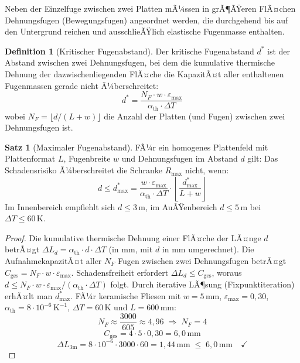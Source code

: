 ﻿\documentclass[a4paper,12pt]{article}
\theoremstyle{definition}
\newtheorem{definition}{Definition}
\newtheorem{satz}{Satz}
\begin{document}
Neben der Einzelfuge zwischen zwei Platten mÃ¼ssen in grÃ¶ÃŸeren FlÃ¤chen
Dehnungsfugen (Bewegungsfugen) angeordnet werden, die durchgehend bis
auf den Untergrund reichen und ausschlieÃŸlich elastische Fugenmasse
enthalten.

\begin{definition}[Kritischer Fugenabstand]
	Der kritische Fugenabstand $d^*$ ist der Abstand zwischen zwei
	Dehnungsfugen, bei dem die kumulative thermische Dehnung der
	dazwischenliegenden FlÃ¤che die KapazitÃ¤t aller enthaltenen
	Fugenmassen gerade nicht Ã¼berschreitet:
	\[
	d^* = \frac{N_F \cdot w \cdot \varepsilon_{\max}}{\alpha_{\text{th}} \cdot \Delta T}
	\]
	wobei $N_F = \lfloor d / (L + w) \rfloor$ die Anzahl der Platten
	(und Fugen) zwischen zwei Dehnungsfugen ist.
\end{definition}

\begin{satz}[Maximaler Fugenabstand]
	\label{satz:fugenabstand}
	FÃ¼r ein homogenes Plattenfeld mit Plattenformat $L$, Fugenbreite $w$
	und Dehnungsfugen im Abstand $d$ gilt: Das Schadensrisiko Ã¼berschreitet
	die Schranke $R_{\max}$ nicht, wenn:
	\[
	d \leq d^*_{\max} = \frac{w \cdot \varepsilon_{\max}}{\alpha_{\text{th}} \cdot \Delta T}
	\cdot \left\lfloor \frac{d^*_{\max}}{L + w} \right\rfloor
	\]
	Im Innenbereich empfiehlt sich $d \leq 3\,\text{m}$, im AuÃŸenbereich
	$d \leq 5\,\text{m}$ bei $\Delta T \leq 60\,\text{K}$.
\end{satz}

\begin{proof}
	Die kumulative thermische Dehnung einer FlÃ¤che der LÃ¤nge $d$ betrÃ¤gt
	$\Delta L_d = \alpha_{\text{th}} \cdot d \cdot \Delta T$ (in mm, mit
	$d$ in mm umgerechnet). Die AufnahmekapazitÃ¤t aller $N_F$ Fugen zwischen
	zwei Dehnungsfugen betrÃ¤gt $C_{\text{ges}} = N_F \cdot w \cdot \varepsilon_{\max}$.
	Schadensfreiheit erfordert $\Delta L_d \leq C_{\text{ges}}$, woraus
	$d \leq N_F \cdot w \cdot \varepsilon_{\max} / (\alpha_{\text{th}} \cdot \Delta T)$
	folgt. Durch iterative LÃ¶sung (Fixpunktiteration) erhÃ¤lt man $d^*_{\max}$.
	FÃ¼r keramische Fliesen mit $w = 5\,\text{mm}$, $\varepsilon_{\max} = 0{,}30$,
	$\alpha_{\text{th}} = 8 \cdot 10^{-6}\,\text{K}^{-1}$, $\Delta T = 60\,\text{K}$
	und $L = 600\,\text{mm}$:
	\[
	N_F \approx \frac{3000}{605} \approx 4{,}96 \;\Rightarrow\; N_F = 4
	\]
	\[
	C_{\text{ges}} = 4 \cdot 5 \cdot 0{,}30 = 6{,}0\,\text{mm}
	\]
	\[
	\Delta L_{3\text{m}} = 8 \cdot 10^{-6} \cdot 3000 \cdot 60 = 1{,}44\,\text{mm}
	\;\leq\; 6{,}0\,\text{mm} \quad \checkmark
	\]
\end{proof}
\end{document}
